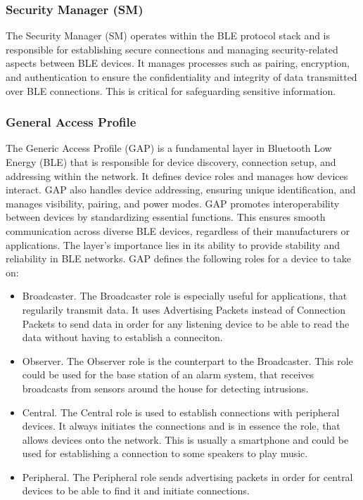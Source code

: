 \subsubsection{Security Manager (SM)}
The Security Manager (SM) operates within the BLE protocol stack and is responsible for establishing secure connections and managing security-related aspects between BLE devices. It manages processes such as pairing, encryption, and authentication to ensure the confidentiality and integrity of data transmitted over BLE connections. This is critical for safeguarding sensitive information.

\subsubsection{General Access Profile}
The Generic Access Profile (GAP) is a fundamental layer in Bluetooth Low Energy (BLE) that is responsible for device discovery, connection setup, and addressing within the network. It defines device roles and manages how devices interact. GAP also handles device addressing, ensuring unique identification, and manages visibility, pairing, and power modes. GAP promotes interoperability between devices by standardizing essential functions. 
This ensures smooth communication across diverse BLE devices, regardless of their manufacturers or applications. The layer's importance lies in its ability to provide stability and reliability in BLE networks. GAP defines the following roles for a device to take on: 
\begin{itemize}
    \item{Broadcaster. The Broadcaster role is especially useful for applications, that regularily transmit data. It uses Advertising Packets instead of Connection Packets to send data in order for any listening device to be able to read the data without having to establish a conneciton.}
    \item{Observer. The Observer role is the counterpart to the Broadcaster. This role could be used for the base station of an alarm system, that receives broadcasts from sensors around the house for detecting intrusions.}
    \item{Central. The Central role is used to establish connections with peripheral devices. It always initiates the connections and is in essence the role, that allows devices onto the network. This is usually a smartphone and could be used for establishing a connection to some speakers to play music.}
    \item{Peripheral. The Peripheral role sends advertising packets in order for central devices to be able to find it and initiate connections.}
\end{itemize}

